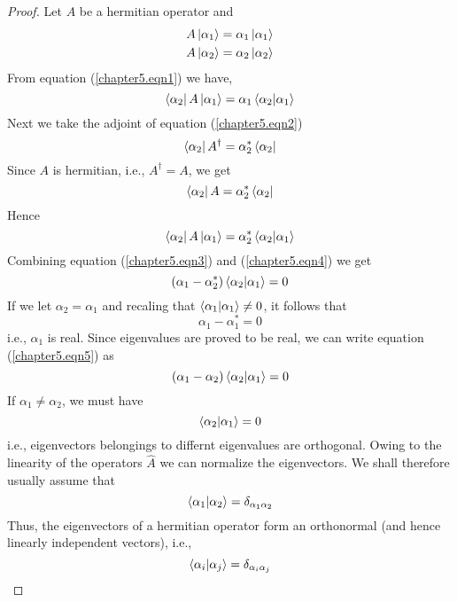 \begin{proof}
	Let $A$ be a hermitian operator and 
	\begin{eqnarray}
		\label{chapter5.eqn1}
		A\ket{\alpha_1} &= \alpha_1 \ket{\alpha_1}\\
		\label{chapter5.eqn2}
		A\ket{\alpha_2} &= \alpha_2 \ket{\alpha_2}
	\end{eqnarray}
	From equation (\ref{chapter5.eqn1}) we have,
	\begin{equation}
		\bra{\alpha_2}A\ket{\alpha_1} = \alpha_1 \braket{\alpha_2}{\alpha_1}
		\label{chapter5.eqn3}
	\end{equation}
	Next we take the adjoint of equation (\ref{chapter5.eqn2})
	\begin{equation}
		\bra{\alpha_2}A^{\dagger} = \alpha_2^* \bra{\alpha_2}
	\end{equation}
	Since $A$ is hermitian, i.e., $A^\dagger = A$, we get
	\begin{equation}
		\bra{\alpha_2}A = \alpha_2^* \bra{\alpha_2}
	\end{equation}
	Hence
	\begin{equation}
		\bra{\alpha_2}A\ket{\alpha_1} = \alpha_2^* \braket{\alpha_2}{\alpha_1}
		\label{chapter5.eqn4}
	\end{equation}
	Combining equation (\ref{chapter5.eqn3}) and (\ref{chapter5.eqn4}) we get
	\begin{equation}
		(\alpha_1 - \alpha_2^*) \braket{\alpha_2}{\alpha_1} = 0
		\label{chapter5.eqn5}
	\end{equation}
	If we let $\alpha_2 = \alpha_1$ and recaling that $\braket{\alpha_1}{\alpha_1} \neq 0$, it follows that
	\begin{equation}
		\alpha_1 - \alpha_1^* = 0
	\end{equation}
	i.e., $\alpha_1$ is real. Since eigenvalues are proved to be real, we can write equation (\ref{chapter5.eqn5}) as
	\begin{equation}
		(\alpha_1 - \alpha_2) \braket{\alpha_2}{\alpha_1} = 0
		\label{chapter5.eqn6}
	\end{equation}
	If $\alpha_1 \neq \alpha_2$, we must have
	\begin{equation}
		\braket{\alpha_2}{\alpha_1} = 0
	\end{equation}
	i.e., eigenvectors belongings to differnt eigenvalues are orthogonal. Owing to the linearity of the operators $\hat{A}$ we can normalize the eigenvectors. We shall therefore usually assume that 
	\begin{equation}
		\braket{\alpha_1}{\alpha_2} = \delta_{\alpha_1\alpha_2}
	\end{equation}
	Thus, the eigenvectors of a hermitian operator form an orthonormal (and hence linearly independent vectors), i.e.,
	\begin{equation}
		\braket{\alpha_i}{\alpha_j} = \delta_{\alpha_i\alpha_j}
	\end{equation}
\end{proof}


